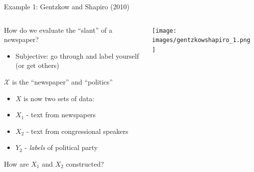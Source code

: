 \documentclass[notes,11pt, aspectratio=169]{beamer}
\newenvironment{wideitemize}{\itemize\addtolength{\itemsep}{10pt}}{\enditemize}
\begin{document}
\begin{frame}{Example 1: Gentzkow and Shapiro (2010)}
      \begin{columns}[onlytextwidth, T] %
      \begin{column}{.5\textwidth}
        \begin{wideitemize}
        \item How do we evaluate the ``slant'' of a newspaper?
          \begin{itemize}
          \item Subjective: go through and label yourself (or get others)
          \end{itemize}
        \item $\mathcal{X}$ is the ``newspaper'' and ``politics''
          \begin{itemize}
          \item $X$ is now two sets of data:
          \item $X_{1}$ - text from newspapers
          \item $X_{2}$ - text from congressional speakers
          \item $Y_{2}$ - \emph{labels} of political party
          \end{itemize}
        \item How are $X_{1}$ and $X_{2}$ constructed? 
        \end{wideitemize}
      \end{column}%
      \hfill%
      \begin{column}{.5\textwidth}
        \texttt{[image: images/gentzkowshapiro\_1.png]}
      \end{column}%
    \end{columns}
\end{frame}
\end{document}
